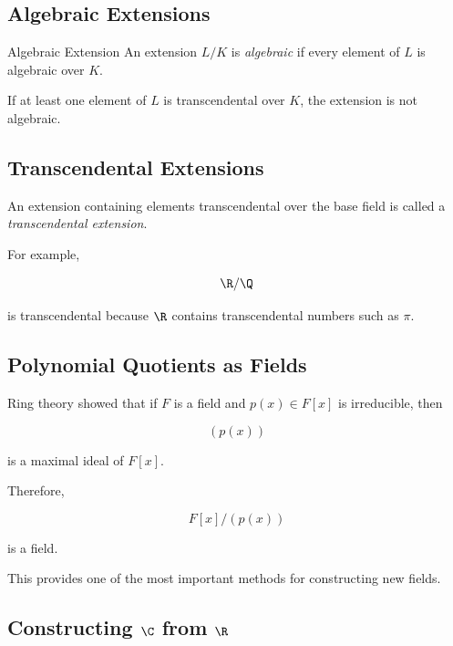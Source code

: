 \subsection{Algebraic Extensions}
\label{subsec:algebraic-extensions}

\begin{definitionbox}{Algebraic Extension}
An extension \(L/K\) is \emph{algebraic} if every element of \(L\) is
algebraic over \(K\).
\end{definitionbox}

If at least one element of \(L\) is transcendental over \(K\), the extension
is not algebraic.

\subsection{Transcendental Extensions}
\label{subsec:transcendental-extensions}

An extension containing elements transcendental over the base field is called
a \emph{transcendental extension}.

For example,

\[ \R/\Q \]

is transcendental because \(\R\) contains transcendental numbers such as
\(\pi\).

\subsection{Polynomial Quotients as Fields}
\label{subsec:polynomial-quotient-fields}

Ring theory showed that if \(F\) is a field and \(p(x)\in F[x]\) is
irreducible, then

\[ (p(x)) \]

is a maximal ideal of \(F[x]\).

Therefore,

\[ F[x]/(p(x)) \]

is a field.

This provides one of the most important methods for constructing new fields.

\subsection{Constructing \(\C\) from \(\R\)}
\label{subsec:constructing-complex-field}

